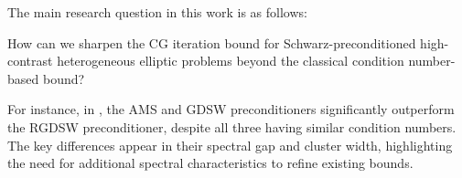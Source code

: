 
The main research question in this work is as follows:
\begin{researchq} \label{rq:main}
    \par
    How can we sharpen the CG iteration bound for Schwarz-preconditioned high-contrast heterogeneous elliptic problems beyond the classical condition number-based bound?
\end{researchq}
For instance, in \cite{ams_coarse_space_comp_study_Alves2024}, the AMS and GDSW preconditioners significantly outperform the RGDSW preconditioner, despite all three having similar condition numbers. The key differences appear in their spectral gap and cluster width, highlighting the need for additional spectral characteristics to refine existing bounds.


